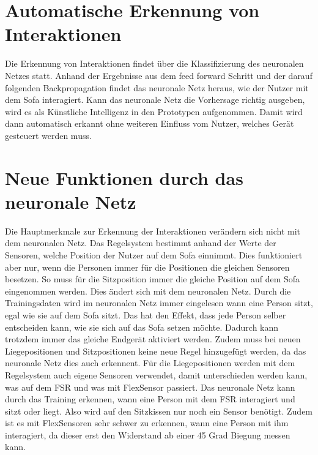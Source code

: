 \section{Automatische Erkennung von Interaktionen}
Die Erkennung von Interaktionen findet über die Klassifizierung des neuronalen Netzes statt. Anhand der Ergebnisse aus dem feed forward Schritt und der darauf folgenden Backpropagation findet das neuronale Netz heraus, wie der Nutzer mit dem Sofa interagiert. 
\newline
Kann das neuronale Netz die Vorhersage richtig ausgeben, wird es als Künstliche Intelligenz in den Prototypen aufgenommen. Damit wird dann automatisch erkannt ohne weiteren Einfluss vom Nutzer, welches Gerät gesteuert werden muss.

\section{Neue Funktionen durch das neuronale Netz}
Die Hauptmerkmale zur Erkennung der Interaktionen verändern sich nicht mit dem neuronalen Netz. Das Regelsystem bestimmt anhand der Werte der Sensoren, welche Position der Nutzer auf dem Sofa einnimmt. Dies funktioniert aber nur, wenn die Personen immer für die Positionen die gleichen Sensoren besetzen. So muss für die Sitzposition immer die gleiche Position auf dem Sofa eingenommen werden. Dies ändert sich mit dem neuronalen Netz. Durch die Trainingsdaten wird im neuronalen Netz immer eingelesen wann eine Person sitzt, egal wie sie auf dem Sofa sitzt. Das hat den Effekt, dass jede Person selber entscheiden kann, wie sie sich auf das Sofa setzen möchte. Dadurch kann trotzdem immer das gleiche Endgerät aktiviert werden. Zudem muss bei neuen Liegepositionen und Sitzpositionen keine neue Regel hinzugefügt werden, da das neuronale Netz dies auch erkennent.
\newline
Für die Liegepositionen werden mit dem Regelsystem auch eigene Sensoren verwendet, damit unterschieden werden kann, was auf dem FSR und was mit FlexSensor passiert. Das neuronale Netz kann durch das Training erkennen, wann eine Person mit dem FSR interagiert und sitzt oder liegt. Also wird auf den Sitzkissen nur noch ein Sensor benötigt. Zudem ist es mit FlexSensoren sehr schwer zu erkennen, wann eine Person mit ihm interagiert, da dieser erst den Widerstand ab einer 45 Grad Biegung messen kann.
